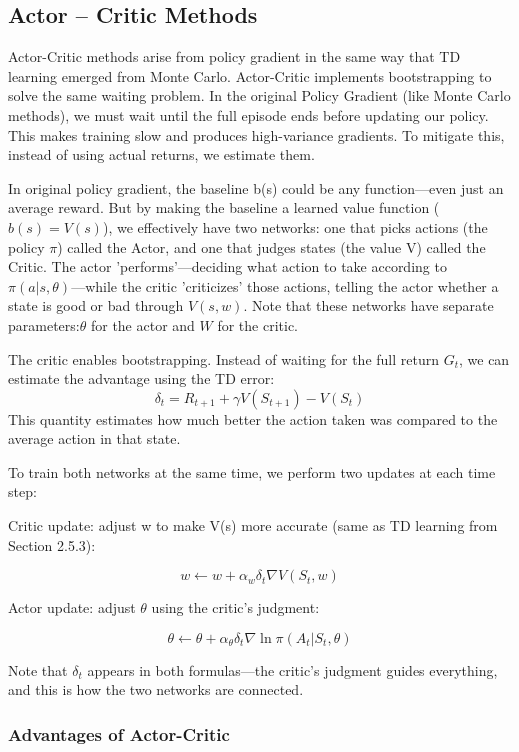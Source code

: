 \subsection{Actor -- Critic Methods}


Actor-Critic methods arise from policy gradient in the same way that TD learning emerged from Monte Carlo. Actor-Critic implements bootstrapping to solve the same waiting problem. In the original Policy Gradient (like Monte Carlo methods), we must wait until the full episode ends before updating our policy. This makes training slow and produces high-variance gradients. To mitigate this, instead of using actual returns, we estimate them.

In original policy gradient, the baseline b(s) could be any function—even just an average reward. But by making the baseline a learned value function ($b(s) = V(s)$), we effectively have two networks: one that picks actions (the policy $\pi$) called the Actor, and one that judges states (the value V) called the Critic. The actor 'performs'—deciding what action to take according to $\pi(a|s,\theta)$—while the critic 'criticizes' those actions, telling the actor whether a state is good or bad through $V(s,w)$. Note that these networks have separate parameters:$\theta$ for the actor and $W$ for the critic.

The critic enables bootstrapping. Instead of waiting for the full return $G_t$, we can estimate the advantage using the TD error:
\[
\delta_t = R_{t+1} + \gamma V(S_{t+1}) - V(S_t)
\]
This quantity estimates how much better the action taken was compared to the average action in that state.



To train both networks at the same time, we perform two updates at each time step:


Critic update: adjust w to make V(s) more accurate (same as TD learning from Section 2.5.3):

\[
w \leftarrow w + \alpha_w \delta_t \nabla V(S_t, w)
\]

Actor update: adjust $\theta$ using the critic's judgment:

\[
\theta \leftarrow \theta + \alpha_\theta \delta_t \nabla \ln \pi(A_t | S_t, \theta)
\]


Note that $\delta_t$ appears in both formulas—the critic's judgment guides everything, and this is how the two networks are connected.

\subsubsection{Advantages of Actor-Critic}


